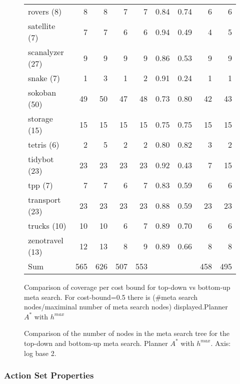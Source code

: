 \begin{figure}[ht]
\begin{tabular}{l||rr||rr|rr||rr}
		rovers (8) & 8 & 8 & 7 & 7 & 0.84 & 0.74 & 6 & 6\\
		satellite (7) & 7 & 7 & 6 & 6 & 0.94 & 0.49 & 4 & 5\\
		scanalyzer (27) & 9 & 9 & 9 & 9 & 0.86 & 0.53 & 9 & 9\\
		snake (7) & 1 & 3 & 1 & 2 & 0.91 & 0.24 & 1 & 1\\
		sokoban (50) & 49 & 50 & 47 & 48 & 0.73 & 0.80 & 42 & 43\\
		storage (15) & 15 & 15 & 15 & 15 & 0.75 & 0.75 & 15 & 15\\
		tetris (6) & 2 & 5 & 2 & 2 & 0.80 & 0.82 & 3 & 2\\
		tidybot (23) & 23 & 23 & 23 & 23 & 0.92 & 0.43 & 7 & 15\\
		tpp (7) & 7 & 7 & 6 & 7 & 0.83 & 0.59 & 6 & 6\\
		transport (23) & 23 & 23 & 23 & 23 & 0.88 & 0.59 & 23 & 23\\
		trucks (10) & 10 & 10 & 6 & 7 & 0.89 & 0.70 & 6 & 6\\
		zenotravel (13) & 12 & 13 & 8 & 9 & 0.89 & 0.66 & 8 & 8\\\hline
		Sum & 565 & 626 & 507 & 553 &  &  & 458 & 495\\
	\end{tabular}
	\caption{Comparison of coverage per cost bound for top-down vs bottom-up meta search.
	For cost-bound=0.5 there is (\#meta search nodes/maximinal number of meta search nodes) displayed.Planner $A^*$ with $h^{max}$}
\end{figure}


\begin{figure}[ht]

\caption{Comparison of the number of nodes in the meta search tree for the top-down and bottom-up meta search.
	Planner $A^*$ with $h^{max}$. Axis: log base 2.}
\end{figure}


\FloatBarrier
\newpage
\subsubsection*{Action Set Properties}

